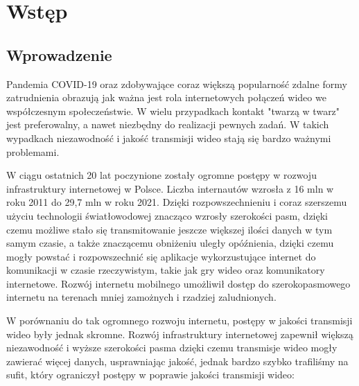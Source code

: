 \chapter{Wstęp}
\section{Wprowadzenie}

Pandemia COVID-19 oraz zdobywające coraz większą popularność zdalne formy zatrudnienia obrazują jak
ważna jest rola internetowych połączeń wideo we współczesnym społeczeństwie. W wielu przypadkach
kontakt "twarzą w twarz" jest preferowalny, a nawet niezbędny do realizacji pewnych zadań. W takich
wypadkach niezawodność i jakość transmisji wideo stają się bardzo ważnymi problemami.

W ciągu ostatnich 20 lat poczynione zostały ogromne postępy w rozwoju infrastruktury internetowej w
Polsce. Liczba internautów wzrosła z 16 mln w roku 2011 do 29,7 mln w roku 2021. Dzięki
rozpowszechnieniu i coraz szerszemu użyciu technologii światłowodowej znacząco wzrosły szerokości
pasm, dzięki czemu możliwe stało się transmitowanie jeszcze większej ilości danych w tym samym
czasie, a także znaczącemu obniżeniu uległy opóźnienia, dzięki czemu mogły powstać i rozpowszechnić
się aplikacje wykorzustujące internet do komunikacji w czasie rzeczywistym, takie jak gry wideo oraz
komunikatory internetowe. Rozwój internetu mobilnego umożliwił dostęp do szerokopasmowego internetu
na terenach mniej zamożnych i rzadziej zaludnionych.

W porównaniu do tak ogromnego rozwoju internetu, postępy w jakości transmisji wideo były jednak
skromne. Rozwój infrastruktury internetowej zapewnił większą niezawodność i wyższe szerokości pasma
dzięki czemu transmisje wideo mogły zawierać więcej danych, usprawniając jakość, jednak bardzo
szybko trafiliśmy na sufit, który ograniczył postępy w poprawie jakości transmisji wideo:

